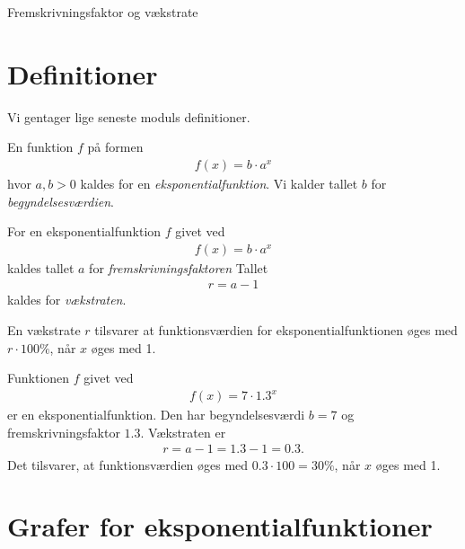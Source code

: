 \begin{center}
\Huge
Fremskrivningsfaktor og vækstrate
\end{center}
\section*{Definitioner}

Vi gentager lige seneste moduls definitioner.

\begin{defn}[Eksponentialfunktion]
	En funktion $f$ på formen
	\begin{align*}
		f(x) = b \cdot a^x
	\end{align*}
	hvor $a,b > 0$ kaldes for en \textit{eksponentialfunktion}.
	Vi kalder tallet $b$ for \textit{begyndelsesværdien}.
\end{defn}

\begin{defn}
	For en eksponentialfunktion $f$ givet ved
	\begin{align*}
		f(x) = b\cdot a^x
	\end{align*}
	kaldes tallet $a$ for \textit{fremskrivningsfaktoren}
	Tallet 
	\begin{align*}
		r = a - 1 
	\end{align*}
	kaldes for \textit{vækstraten}.
\end{defn}

\begin{setn}
	En vækstrate $r$ tilsvarer at funktionsværdien for eksponentialfunktionen øges med 
	$r \cdot 100\%$, når $x$ øges med 1. 
\end{setn}

\begin{exa}
	Funktionen $f$ givet ved
	\begin{align*}
		f(x) = 7\cdot 1.3^x
	\end{align*}
	er en eksponentialfunktion. Den har begyndelsesværdi $b = 7$ og fremskrivningsfaktor $1.3$.
	Vækstraten er 
	\begin{align*}
		r = a - 1 = 1.3 - 1 = 0.3.
	\end{align*}
	Det tilsvarer, at funktionsværdien øges med $0.3 \cdot 100 = 30\%$, når $x$ øges med 1. 
\end{exa}

\section*{Grafer for eksponentialfunktioner}

